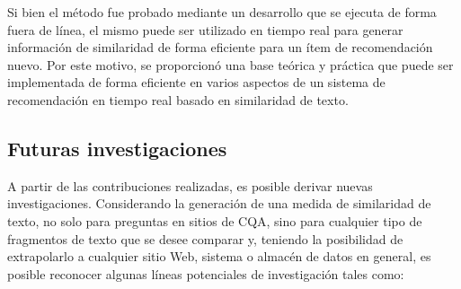 \bigskip Si bien el método fue probado mediante un desarrollo que se ejecuta de forma fuera de línea, el mismo puede ser utilizado en tiempo real para generar información de similaridad de forma eficiente para un ítem de recomendación nuevo. Por este motivo, se proporcionó una base teórica y práctica que puede ser implementada de forma eficiente en varios aspectos de un sistema de recomendación en tiempo real basado en similaridad de texto.


\subsection{Futuras investigaciones}
A partir de las contribuciones realizadas, es posible derivar nuevas investigaciones. Considerando la generación de una medida de similaridad de texto, no solo para preguntas en sitios de CQA, sino para cualquier tipo de fragmentos de texto que se desee comparar y, teniendo la posibilidad de extrapolarlo a cualquier sitio Web, sistema o almacén de datos en general, es posible reconocer algunas líneas potenciales de investigación tales como:
